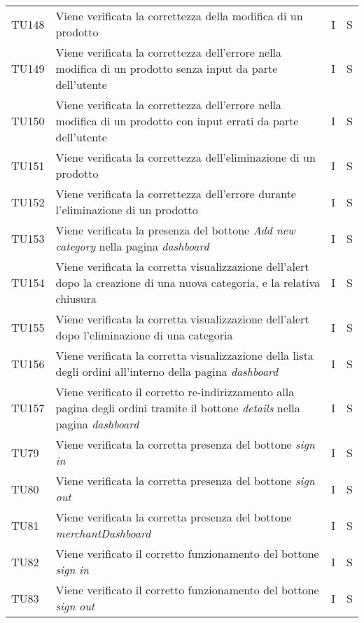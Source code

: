 {\begin{longtable}{C{2cm} C{9.6cm} C{1.5cm} C{1cm}}
TU148 & Viene verificata la correttezza della modifica di un prodotto & I & S\\

TU149 & Viene verificata la correttezza dell'errore nella modifica di un prodotto senza input da parte dell'utente & I & S\\

TU150 & Viene verificata la correttezza dell'errore nella modifica di un prodotto con input errati da parte dell'utente & I & S\\

TU151 & Viene verificata la correttezza dell'eliminazione di un prodotto & I & S\\

TU152 & Viene verificata la correttezza dell'errore durante l'eliminazione di un prodotto & I & S\\

TU153 & Viene verificata la presenza del bottone \textit{Add new category} nella pagina \textit{dashboard} & I & S\\

TU154 & Viene verificata la corretta visualizzazione dell'alert dopo la creazione di una nuova categoria, e la relativa chiusura & I & S\\

TU155 & Viene verificata la corretta visualizzazione dell'alert dopo l'eliminazione di una categoria & I & S\\

TU156 & Viene verificata la corretta visualizzazione della lista degli ordini all'interno della pagina \textit{dashboard} & I & S\\

TU157 & Viene verificato il corretto re-indirizzamento alla pagina degli ordini tramite il bottone \textit{details} nella pagina \textit{dashboard} & I & S\\


TU79 & Viene verificata la corretta presenza del bottone \textit{sign in}& I & S\\

TU80 & Viene verificata la corretta presenza del bottone \textit{sign out} & I & S\\

TU81 & Viene verificata la corretta presenza del bottone \textit{merchantDashboard} & I & S\\

TU82 & Viene verificato il corretto funzionamento del bottone \textit{sign in} & I & S\\

TU83 & Viene verificato il corretto funzionamento del bottone \textit{sign out} & I & S\\


\end{longtable}

}

